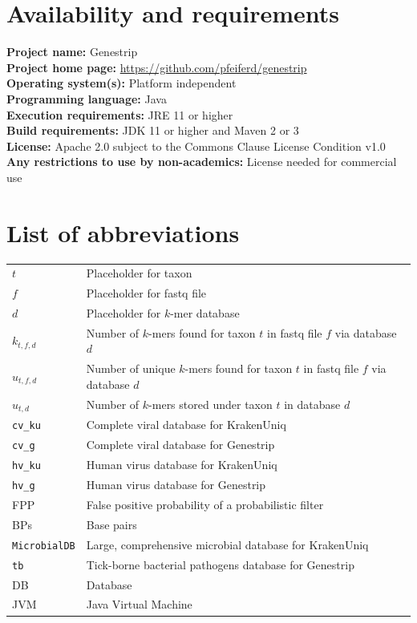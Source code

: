 \documentclass[pdflatex,sn-vancouver-num]{sn-jnl}
\begin{document}
\section{Availability and requirements}

\textbf{Project name:} Genestrip\\
\textbf{Project home page:} \url{https://github.com/pfeiferd/genestrip}\\
\textbf{Operating system(s):} Platform independent\\
\textbf{Programming language:} Java\\
\textbf{Execution requirements:} JRE 11 or higher \\
\textbf{Build requirements:} JDK 11 or higher and Maven 2 or 3\\
\textbf{License:} Apache 2.0 subject to the Commons Clause License Condition v1.0 \\
\textbf{Any restrictions to use by non-academics:} License needed for commercial use\\

\section{List of abbreviations}

\begin{tabular}{lp{10cm}}
$t$ & Placeholder for taxon \\
$f$ & Placeholder for fastq file \\
$d$ & Placeholder for $k$-mer database \\
$k_{t,f,d}$& Number of $k$-mers found for taxon $t$ in fastq file $f$ via database $d$\\
$u_{t,f,d}$& Number of unique $k$-mers found for taxon $t$ in fastq file $f$  via database $d$\\
$u_{t,d}$& Number of $k$-mers stored under taxon $t$ in database $d$ \\
\texttt{cv\_ku} & Complete viral database for KrakenUniq \\
\texttt{cv\_g} & Complete viral database for Genestrip \\
\texttt{hv\_ku} & Human virus database for KrakenUniq \\
\texttt{hv\_g} & Human virus database for Genestrip \\
FPP & False positive probability of a probabilistic filter \\
BPs & Base pairs \\
\texttt{MicrobialDB} & Large, comprehensive microbial database for KrakenUniq \\
\texttt{tb} & Tick-borne bacterial pathogens database for Genestrip \\
DB & Database \\
JVM & Java Virtual Machine \\ 
\end{tabular}
\end{document}
